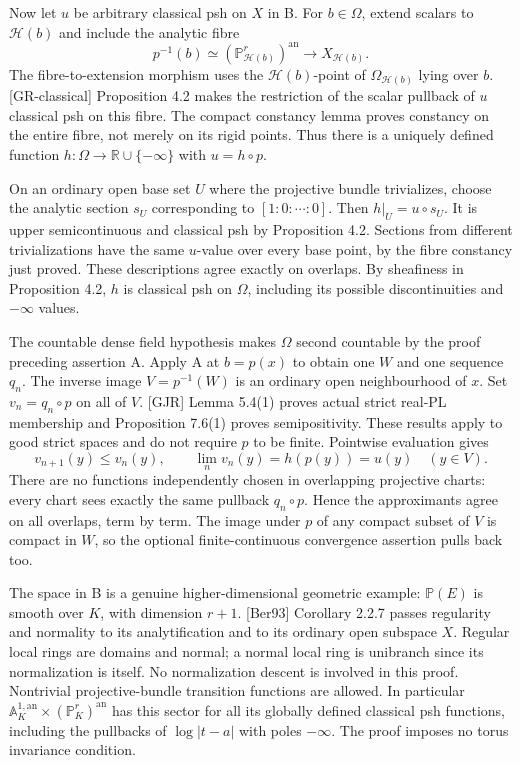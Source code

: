 \documentclass[
  11pt,
]{article}
\begin{document}
Now let \(u\) be arbitrary classical psh on \(X\) in B. For
\(b\in\Omega\), extend scalars to \(\mathcal H(b)\) and include the
analytic fibre
\[p^{-1}(b)\simeq(\mathbb P_{\mathcal H(b)}^r)^{\mathrm{an}}\longrightarrow X_{\mathcal H(b)}.\]
The fibre-to-extension morphism uses the \(\mathcal H(b)\)-point of
\(\Omega_{\mathcal H(b)}\) lying over \(b\). {[}GR-classical{]}
Proposition 4.2 makes the restriction of the scalar pullback of \(u\)
classical psh on this fibre. The compact constancy lemma proves
constancy on the entire fibre, not merely on its rigid points. Thus
there is a uniquely defined function
\(h:\Omega\to\mathbb R\cup\{-\infty\}\) with \(u=h\circ p\).

On an ordinary open base set \(U\) where the projective bundle
trivializes, choose the analytic section \(s_U\) corresponding to
\([1:0:\cdots:0]\). Then \(h|_U=u\circ s_U\). It is upper semicontinuous
and classical psh by Proposition 4.2. Sections from different
trivializations have the same \(u\)-value over every base point, by the
fibre constancy just proved. These descriptions agree exactly on
overlaps. By sheafiness in Proposition 4.2, \(h\) is classical psh on
\(\Omega\), including its possible discontinuities and \(-\infty\)
values.

The countable dense field hypothesis makes \(\Omega\) second countable
by the proof preceding assertion A. Apply A at \(b=p(x)\) to obtain one
\(W\) and one sequence \(q_n\). The inverse image \(V=p^{-1}(W)\) is an
ordinary open neighbourhood of \(x\). Set \(v_n=q_n\circ p\) on all of
\(V\). {[}GJR{]} Lemma 5.4(1) proves actual strict real-PL membership
and Proposition 7.6(1) proves semipositivity. These results apply to
good strict spaces and do not require \(p\) to be finite. Pointwise
evaluation gives
\[v_{n+1}(y)\le v_n(y),\qquad\lim_n v_n(y)=h(p(y))=u(y)\quad(y\in V).\]
There are no functions independently chosen in overlapping projective
charts: every chart sees exactly the same pullback \(q_n\circ p\). Hence
the approximants agree on all overlaps, term by term. The image under
\(p\) of any compact subset of \(V\) is compact in \(W\), so the
optional finite-continuous convergence assertion pulls back too.

The space in B is a genuine higher-dimensional geometric example:
\(\mathbb P(E)\) is smooth over \(K\), with dimension \(r+1\).
{[}Ber93{]} Corollary 2.2.7 passes regularity and normality to its
analytification and to its ordinary open subspace \(X\). Regular local
rings are domains and normal; a normal local ring is unibranch since its
normalization is itself. No normalization descent is involved in this
proof. Nontrivial projective-bundle transition functions are allowed. In
particular
\(\mathbb A_K^{1,\mathrm{an}}\times(\mathbb P_K^r)^{\mathrm{an}}\) has
this sector for all its globally defined classical psh functions,
including the pullbacks of \(\log|t-a|\) with poles \(-\infty\). The
proof imposes no torus invariance condition.
\end{document}
